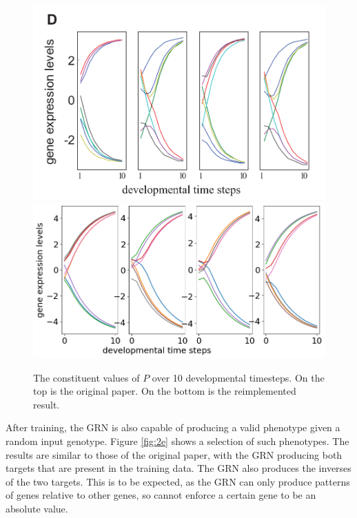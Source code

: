 \documentclass[twocolumn,a4paper,11pt]{article}
\begin{document}
    \begin{figure}[h]
        \centering
        \includegraphics[width=0.9\linewidth]{orig_img/fig2d.png}
        \includegraphics[width=0.9\linewidth]{img/fig2d.png}
        \caption{The constituent values of $P$ over 10 developmental timesteps. On the top is the original paper. On the bottom is the reimplemented result.} \label{fig:2d}
    \end{figure}

    After training, the GRN is also capable of producing a valid phenotype given a random input genotype. Figure \ref{fig:2e} shows a selection of such phenotypes. The results are similar to those of the original paper, with the GRN producing both targets that are present in the training data. The GRN also produces the inverses of the two targets. This is to be expected, as the GRN can only produce patterns of genes relative to other genes, so cannot enforce a certain gene to be an absolute value.
\end{document}
